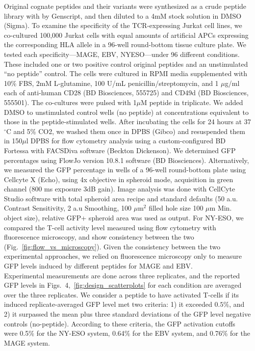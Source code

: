  Original cognate peptides and their
variants were synthesized as a crude peptide library with by Genscript, and then diluted to a 4mM
stock solution in DMSO (Sigma). To examine the specificity of the TCR-expressing Jurkat cell lines,
we co-cultured 100,000 Jurkat cells with equal amounts of artificial APCs expressing the
corresponding HLA allele in a 96-well round-bottom tissue culture plate. We tested each
specificity—MAGE, EBV, NYESO—under 96 different conditions. These included one or two positive
control original peptides and an unstimulated “no peptide” control. The cells were cultured in RPMI
media supplemented with 10\% FBS, 2mM L-glutamine, 100 U/mL penicillin/streptomycin, and 1 $\mu$g/ml
each of anti-human CD28 (BD Biosciences, 555725) and CD49d (BD Biosciences, 555501). The co-cultures
were pulsed with 1$\mu$M peptide in triplicate. We added DMSO to unstimulated control wells (no
peptide) at concentrations equivalent to those in the peptide-stimulated wells. After incubating the
cells for 24 hours at 37$^\circ$C and 5\% CO2, we washed them once in DPBS (Gibco) and resuspended
them in 150$\mu$l DPBS for flow cytometry analysis using a custom-configured BD Fortessa with
FACSDiva software (Beckton Dickenson). We determined GFP percentages using FlowJo version 10.8.1
software (BD Biosciences). Alternatively, we measured the GFP percentage in wells of a 96-well
round-bottom plate using Cellcyte X (Echo), using 4x objective in spheroid mode, acquisition in
green channel (800 ms exposure 3dB gain). Image analysis was done with CellCyte Studio software with
total spheroid area recipe and standard defaults (50 a.u. Contrast Sensitivity, 2 a.u Smoothing, 100
$\mu$m$^2$ filled hole size 100 $\mu$m Min. object size), relative GFP+ spheroid area was used as
output. For NY-ESO, we compared the T-cell activity level measured using flow cytometry with
fluorescence microscopy, and show consistency between the two (Fig.~\ref{fig:flow_vs_microscopy}).
Given the consistency between the two experimental approaches, we relied on fluorescence microscopy
only to measure GFP levels induced by different peptides for MAGE and EBV. \\

 Experimental
measurements are done across three replicates, and the reported GFP levels in
Figs.~4,~\ref{fig:design_scatterplots} for each condition are averaged over the three replicates. We
consider a peptide to have activated T-cells if its induced replicate-averaged GFP level met two
criteria: 1) it exceeded $0.5\%$, and 2) it surpassed the mean plus three standard deviations of the
GFP level negative controls (no-peptide).
According to these criteria, the GFP activation cutoffs were 0.5\% for the NY-ESO system, 0.64\% for
the EBV system, and 0.76\% for the MAGE system.




